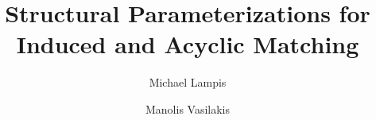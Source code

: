 \documentclass[a4paper,USenglish,cleveref,pdfa]{lipics-v2021}
\title{Structural Parameterizations for Induced and Acyclic Matching}
\author{Michael Lampis}
{Universit\'{e} Paris-Dauphine, PSL University, CNRS UMR7243, LAMSADE, Paris, France}
{michail.lampis@dauphine.fr}
{https://orcid.org/0000-0002-5791-0887}{}
\author{Manolis Vasilakis}
{Universit\'{e} Paris-Dauphine, PSL University, CNRS UMR7243, LAMSADE, Paris, France}
{emmanouil.vasilakis@dauphine.eu}
{https://orcid.org/0000-0001-6505-2977}{}
\begin{document}
\maketitle

\begin{abstract}

\end{abstract}

\newpage















\end{document}
